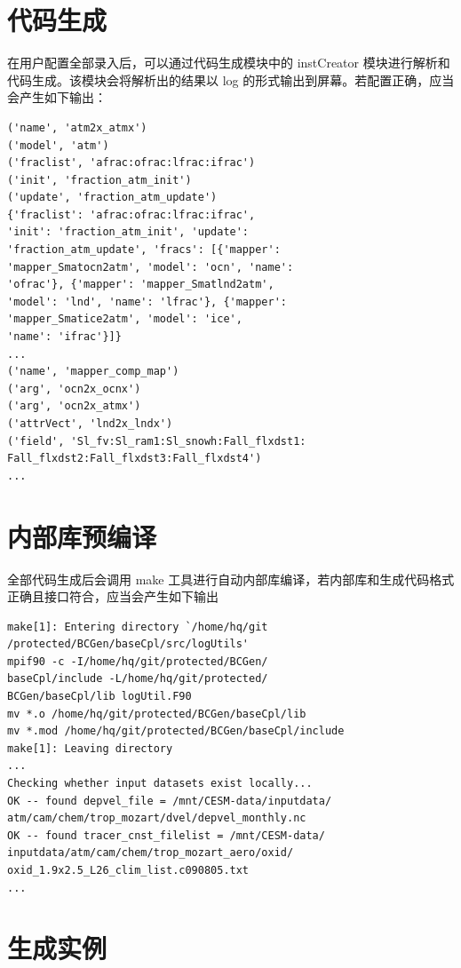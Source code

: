 \section {代码生成}

在用户配置全部录入后，可以通过代码生成模块中的 instCreator 模块进行解析和代码生成。该模块会将解析出的结果以 log 的形式输出到屏幕。若配置正确，应当会产生如下输出：

\begin{lstlisting}
('name', 'atm2x_atmx')
('model', 'atm')
('fraclist', 'afrac:ofrac:lfrac:ifrac')
('init', 'fraction_atm_init')
('update', 'fraction_atm_update')
{'fraclist': 'afrac:ofrac:lfrac:ifrac', 
'init': 'fraction_atm_init', 'update': 
'fraction_atm_update', 'fracs': [{'mapper': 
'mapper_Smatocn2atm', 'model': 'ocn', 'name': 
'ofrac'}, {'mapper': 'mapper_Smatlnd2atm',
'model': 'lnd', 'name': 'lfrac'}, {'mapper':
'mapper_Smatice2atm', 'model': 'ice',
'name': 'ifrac'}]}
...
('name', 'mapper_comp_map')
('arg', 'ocn2x_ocnx')
('arg', 'ocn2x_atmx')
('attrVect', 'lnd2x_lndx')
('field', 'Sl_fv:Sl_ram1:Sl_snowh:Fall_flxdst1:
Fall_flxdst2:Fall_flxdst3:Fall_flxdst4')
...
\end{lstlisting}

\section {内部库预编译}

全部代码生成后会调用 make 工具进行自动内部库编译，若内部库和生成代码格式正确且接口符合，应当会产生如下输出

\begin{lstlisting}
make[1]: Entering directory `/home/hq/git
/protected/BCGen/baseCpl/src/logUtils'
mpif90 -c -I/home/hq/git/protected/BCGen/
baseCpl/include -L/home/hq/git/protected/
BCGen/baseCpl/lib logUtil.F90 
mv *.o /home/hq/git/protected/BCGen/baseCpl/lib
mv *.mod /home/hq/git/protected/BCGen/baseCpl/include
make[1]: Leaving directory 
...
Checking whether input datasets exist locally...
OK -- found depvel_file = /mnt/CESM-data/inputdata/
atm/cam/chem/trop_mozart/dvel/depvel_monthly.nc
OK -- found tracer_cnst_filelist = /mnt/CESM-data/
inputdata/atm/cam/chem/trop_mozart_aero/oxid/
oxid_1.9x2.5_L26_clim_list.c090805.txt
...
\end{lstlisting}

\section {生成实例}

